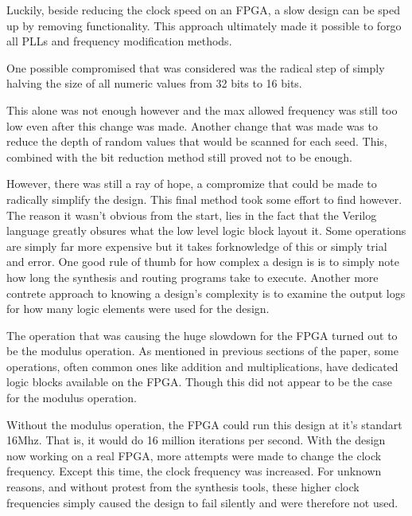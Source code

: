 \documentclass{article}
\begin{document}
    Luckily, beside reducing the clock speed on an FPGA, a slow design
    can be sped up by removing functionality.
    This approach ultimately made it possible to forgo all PLLs and
    frequency modification methods.

    One possible compromised that was considered was the radical step
    of simply halving the size of all numeric values from 32 bits to 16
    bits.

    This alone was not enough however and the max allowed frequency was still
    too low even after this change was made.
    Another change that was made was to reduce the depth of random values
    that would be scanned for each seed.
    This, combined with the bit reduction method still proved not to be enough.

    However, there was still a ray of hope, a compromize that could be made
    to radically simplify the design.
    This final method took some effort to find however. The reason
    it wasn't obvious from the start, lies in the fact that
    the Verilog language greatly obsures what the low level logic block
    layout it.
    Some operations are simply far more expensive but it takes forknowledge of
    this or simply trial and error.
    One good rule of thumb for how complex a design is is to simply
    note how long the synthesis and routing programs take to execute.
    Another more contrete approach to knowing a design's complexity
    is to examine the output logs for how many logic elements were
    used for the design.

    The operation that was causing the huge slowdown for the FPGA turned
    out to be the modulus operation.
    As mentioned in previous sections of the paper, some operations,
    often common ones like addition and multiplications, have dedicated
    logic blocks available on the FPGA.
    Though this did not appear to be the case for the modulus operation.

    Without the modulus operation, the FPGA could run this design at it's
    standart 16Mhz. That is, it would do 16 million iterations per second.
    With the design now working on a real FPGA, more attempts were made
    to change the clock frequency. Except this time,
    the clock frequency was increased.
    For unknown reasons, and without protest from the synthesis tools,
    these higher clock frequencies simply caused the design to fail
    silently and were therefore not used.

    \lstset{language=Verilog}
\end{document}
